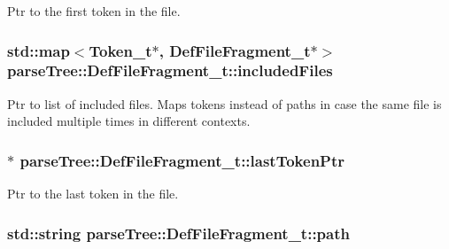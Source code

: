 Ptr to the first token in the file. 

\subsubsection[{\texorpdfstring{included\+Files}{includedFiles}}]{\setlength{\rightskip}{0pt plus 5cm}std\+::map$<${\bf Token\+\_\+t}$\ast$, {\bf Def\+File\+Fragment\+\_\+t}$\ast$$>$ parse\+Tree\+::\+Def\+File\+Fragment\+\_\+t\+::included\+Files}\hypertarget{structparse_tree_1_1_def_file_fragment__t_a0e596aa535a421984a6936d8ae8d1ebf}{}\label{structparse_tree_1_1_def_file_fragment__t_a0e596aa535a421984a6936d8ae8d1ebf}
Ptr to list of included files. Maps tokens instead of paths in case the same file is included multiple times in different contexts. 
\subsubsection[{\texorpdfstring{last\+Token\+Ptr}{lastTokenPtr}}]{$\ast$ parse\+Tree\+::\+Def\+File\+Fragment\+\_\+t\+::last\+Token\+Ptr}\hypertarget{structparse_tree_1_1_def_file_fragment__t_afe8f97ab2826577f09ce30c62ee34ee2}{}\label{structparse_tree_1_1_def_file_fragment__t_afe8f97ab2826577f09ce30c62ee34ee2}


Ptr to the last token in the file. 

\subsubsection[{\texorpdfstring{path}{path}}]{\setlength{\rightskip}{0pt plus 5cm}std\+::string parse\+Tree\+::\+Def\+File\+Fragment\+\_\+t\+::path}\hypertarget{structparse_tree_1_1_def_file_fragment__t_af38bb92643720eb688ab573d97de2234}{}\label{structparse_tree_1_1_def_file_fragment__t_af38bb92643720eb688ab573d97de2234}


